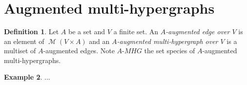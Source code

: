 \documentclass[a4paper]{article}
\DeclareMathOperator{\m}{\mathcal{M}}
\theoremstyle{definition}
\newtheorem{definition}{Definition}
\newtheorem{example}[definition]{Example}
\begin{document}



\section{Augmented multi-hypergraphs}

\begin{definition}
Let $A$ be a set and $V$ a finite set. An \textit{$A$-augmented edge over $V$} is an element of $\m(V\times A)$ and an \textit{$A$-augmented multi-hypergraph over $V$} is a multiset of $A$-augmented edges. Note $A\text{-}MHG$ the set species of $A$-augmented multi-hypergraphs.
\end{definition}

\begin{example}
...
\end{example}
\end{document}
